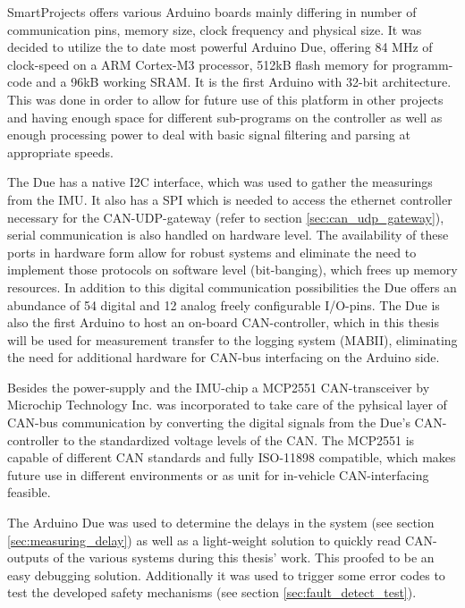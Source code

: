 \documentclass[ExampleMasters.tex]{subfiles}
\begin{document}
SmartProjects offers various Arduino boards mainly differing in number of communication pins, memory size, clock frequency and physical size. It was decided to utilize the to date most powerful Arduino Due, offering 84 MHz of clock-speed on a ARM Cortex-M3 processor, 512kB flash memory for programm-code and a 96kB working SRAM. It is the first Arduino with 32-bit architecture. This was done in order to allow for future use of this platform in other projects and having enough space for different sub-programs on the controller as well as enough processing power to deal with basic signal filtering and parsing at appropriate speeds. 

The Due has a native \gls{I2C} interface, which was used to gather the measurings from the \gls{IMU}. It also has a \gls{SPI} which is needed to access the ethernet controller necessary for the \gls{CAN}-\Gls{UDP}-gateway (refer to section \ref{sec:can_udp_gateway}), serial communication is also handled on hardware level. The availability of these ports in hardware form allow for robust systems and eliminate the need to implement those protocols on software level (bit-banging), which frees up memory resources. In addition to this digital communication possibilities the Due offers an abundance of 54 digital and 12 analog freely configurable I/O-pins. The Due is also the first Arduino to host an on-board \gls{CAN}-controller, which in this thesis will be used for measurement transfer to the logging system (\gls{MABII}), eliminating the need for additional hardware for \gls{CAN}-bus interfacing on the Arduino side.

Besides the power-supply and the \gls{IMU}-chip a MCP2551 CAN-transceiver by Microchip Technology Inc. was incorporated to take care of the pyhsical layer of CAN-bus communication by converting the digital signals from the Due's CAN-controller to the standardized voltage levels of the \gls{CAN}. The MCP2551 is capable of different \gls{CAN} standards and fully ISO-11898 compatible, which makes future use in different environments or as unit for in-vehicle CAN-interfacing feasible.

The Arduino Due was used to determine the delays in the system (see section \ref{sec:measuring_delay}) as well as a light-weight solution to quickly read \gls{CAN}-outputs of the various systems during this thesis' work. This proofed to be an easy debugging solution. Additionally it was used to trigger some error codes to test the developed safety mechanisms (see section \ref{sec:fault_detect_test}). 

\end{document}
